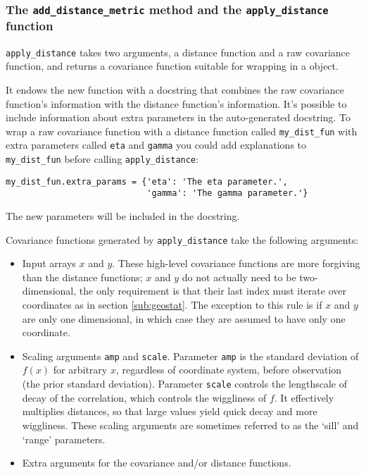 \documentclass[]{manual}
\begin{document}
\subsubsection{The \texttt{add_distance_metric} method and the \texttt{apply_distance} function}\label{sub:add_distance_metric}
\texttt{apply_distance} takes two arguments, a distance function and a raw covariance function, and returns a covariance function suitable for wrapping in a  object.

It endows the new function with a docstring that combines the raw covariance function's information with the distance function's information. It's possible to include information about extra parameters in the auto-generated docstring. To wrap a raw covariance function with a distance function called \texttt{my_dist_fun} with extra parameters called \texttt{eta} and \texttt{gamma} you could add explanations to \texttt{my_dist_fun} before calling \texttt{apply_distance}:
\begin{verbatim}
my_dist_fun.extra_params = {'eta': 'The eta parameter.',
                            'gamma': 'The gamma parameter.'}
\end{verbatim}
The new parameters will be included in the docstring.

Covariance functions generated by \texttt{apply_distance} take the following arguments:
\begin{itemize}
    \item Input arrays $x$ and $y$. These high-level covariance functions are more forgiving than the distance functions; $x$ and $y$ do not actually need to be two-dimensional, the only requirement is that their last index must iterate over coordinates as in section \ref{sub:geostat}. The exception to this rule is if $x$ and $y$ are only one dimensional, in which case they are assumed to have only one coordinate.
    \item Scaling arguments \texttt{amp} and \texttt{scale}. Parameter \texttt{amp} is the standard deviation of $f(x)$ for arbitrary $x$, regardless of coordinate system, before observation (the prior standard deviation). Parameter \texttt{scale} controls the lengthscale of decay of the correlation, which controls the wiggliness of $f$. It effectively multiplies distances, so that large values yield quick decay and more wiggliness. These scaling arguments are sometimes referred to as the `sill' and `range' parameters.
    \item Extra arguments for the covariance and/or distance functions.
\end{itemize}
\end{document}
